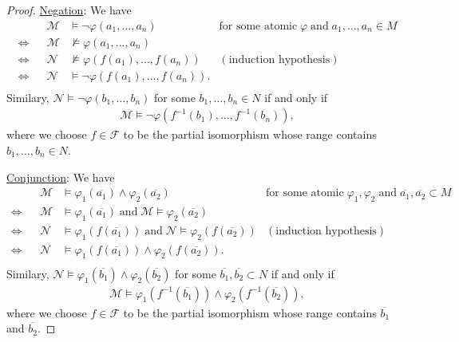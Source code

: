 \documentclass{article}
\begin{document}
\begin{enumerate}[label={\bf Q\arabic*:}]
\begin{proof}
      \underline{Negation}: We have
      \begin{align*}
                    && \mathcal{M}
                    & \models\neg\varphi(a_1,\ldots,a_n)
                    & \text{for some atomic}\; \varphi\; \text{and}\;
                      a_1,\ldots,a_n\in M \\
        \Leftrightarrow && \mathcal{M}
                    & \not\models\varphi(a_1,\ldots,a_n) & \\
        \Leftrightarrow && \mathcal{N}
                    & \not\models\varphi(f(a_1),\ldots,f(a_n))
                    & (\text{induction hypothesis}) \\
        \Leftrightarrow && \mathcal{N}
                    & \models\neg\varphi(f(a_1),\ldots,f(a_n)). & \\
      \end{align*}
      Similary, $\mathcal{N}\models\neg\varphi(b_1,\ldots,b_n)$ for some
      $b_1,\ldots,b_n\in N$ if and only if
      \begin{align*}
        \mathcal{M}\models\neg\varphi(f^{-1}(b_1),\ldots,f^{-1}(b_n)),
      \end{align*}
      where we choose $f\in\mathcal{F}$ to be the partial isomorphism whose
      range contains $b_1,\ldots,b_n\in N$.

      \underline{Conjunction}: We have
      \begin{align*}
                    && \mathcal{M}
                    & \models\varphi_1(\overline{a_1})\wedge\varphi_2(\overline{a_2})
                    & \text{for some atomic}\; \varphi_1,\varphi_2\;
                      \text{and}\;
                      \overline{a_1},\overline{a_2}\subset M \\
        \Leftrightarrow && \mathcal{M}
                    & \models\varphi_1(\overline{a_1})\;
                      \text{and}\;
                      \mathcal{M}\models\varphi_2(\overline{a_2}) & \\
        \Leftrightarrow && \mathcal{N}
                    & \models\varphi_1(f(\overline{a_1}))\;
                      \text{and}\;
                      \mathcal{N}\models\varphi_2(f(\overline{a_2}))
                    & (\text{induction hypothesis}) \\
        \Leftrightarrow && \mathcal{N}
                    &
                    \models\varphi_1(f(\overline{a_1}))\wedge\varphi_2(f(\overline{a_2})).
                    & \\
      \end{align*}
      Similary,
      $\mathcal{N}\models\varphi_1(\overline{b_1})\wedge\varphi_2(\overline{b_2})$
      for some
      $\overline{b_1},\overline{b_2}\subset N$ if and only if
      \begin{align*}
        \mathcal{M}\models\varphi_1(f^{-1}(\overline{b_1}))\wedge\varphi_2(f^{-1}(\overline{b_2})),
      \end{align*}
      where we choose $f\in\mathcal{F}$ to be the partial isomorphism whose
      range contains $\overline{b_1}$ and $\overline{b_2}$.
    \end{proof}
\end{enumerate}
\end{document}
